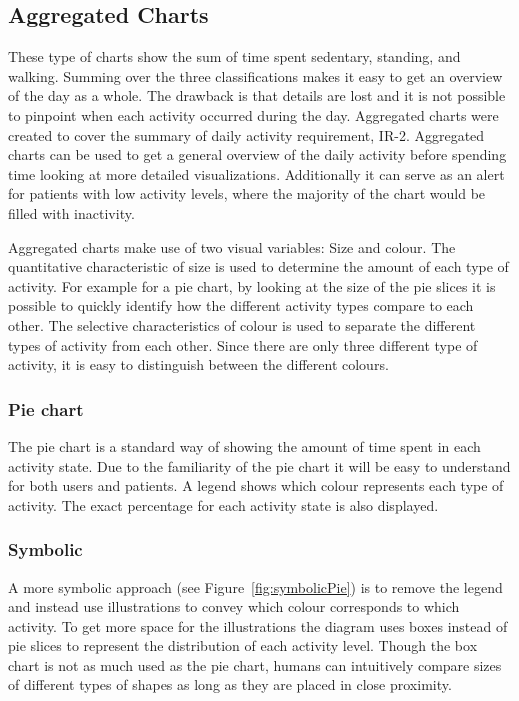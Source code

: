 \subsection{Aggregated Charts}
These type of charts show the sum of time spent sedentary, standing, and walking. Summing over the three classifications makes it easy to get an overview of the day as a whole. The drawback is that details are lost and it is not possible to pinpoint when each activity occurred during the day. Aggregated charts were created to cover the summary of daily activity requirement, IR-2. Aggregated charts can be used to get a general overview of the daily activity before spending time looking at more detailed visualizations. Additionally it can serve as an alert for patients with low activity levels, where the majority of the chart would be filled with inactivity.

Aggregated charts make use of two visual variables: Size and colour. The quantitative characteristic of size is used to determine the amount of each type of activity. For example for a pie chart, by looking at the size of the pie slices it is possible to quickly identify how the different activity types compare to each other. The selective characteristics of colour is used to separate the different types of activity from each other. Since there are only three different type of activity, it is easy to distinguish between the different colours. 

\subsubsection{Pie chart}
The pie chart is a standard way of showing the amount of time spent in each activity state. Due to the familiarity of the pie chart it will be easy to understand for both users and patients. A legend shows which colour represents each type of activity. The exact percentage for each activity state is also displayed.

\subsubsection{Symbolic}
A more symbolic approach (see Figure~\ref{fig:symbolicPie}) is to remove the legend and instead use illustrations to convey which colour corresponds to which activity. To get more space for the illustrations the diagram uses boxes instead of pie slices to represent the distribution of each activity level. Though the box chart is not as much used as the pie chart, humans can intuitively compare sizes of different types of shapes as long as they are placed in close proximity. 

